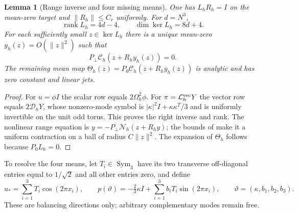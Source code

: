 \documentclass[11pt]{article}
\newtheorem{lemma}[lemma]{Lemma}
\theoremstyle{definition}
\theoremstyle{remark}
\begin{document}
\begin{lemma}[Range inverse and four missing means]
\label{lem:supp-initial-range}
One has $L_hR_h=I$ on the mean-zero target and
$\|R_h\|\le C_r$ uniformly.  For $d=N^3$,
\begin{equation}
 \operatorname{rank}L_h=4d-4,
 \qquad\dim\ker L_h=8d+4.
 \label{eq:supp-initial-rank}
\end{equation}
For each sufficiently small $z\in\ker L_h$ there is a unique mean-zero
$y_h(z)=O(\|z\|^2)$ such that
\begin{equation}
 P_\perp\mathscr C_h(z+R_hy_h(z))=0.
 \label{eq:supp-initial-range-zero}
\end{equation}
The remaining mean map
$\Theta_h(z)=P_0\mathscr C_h(z+R_hy_h(z))$ is analytic and has zero constant
and linear jets.
\end{lemma}
\begin{proof}
For $u=\phi I$ the scalar row equals $2\Omega_h^2\phi$.  For
$\pi=\mathcal L_h^{\rm vec}Y$ the vector row equals $2\mathcal D_hY$, whose
nonzero-mode symbol is $|\kappa|^2I+\kappa\kappa^T/3$ and is uniformly
invertible on the unit odd torus.  This proves the right inverse and rank.
The nonlinear range equation is
$y=-P_\perp\mathscr N_h(z+R_hy)$; the bounds of
 make it a uniform contraction on a ball of
radius $C\|z\|^2$.  The expansion of $\Theta_h$ follows because
$P_0L_h=0$.
\end{proof}

To resolve the four means, let $T_i\in\operatorname{Sym}_3$ have its two
transverse off-diagonal entries equal to $1/\sqrt2$ and all other entries
zero, and define
\begin{equation}
 u_*=\sum_{i=1}^3T_i\cos(2\pi x_i),\qquad
 p(\vartheta)=-\tfrac23\kappa I
       +\sum_{i=1}^3b_iT_i\sin(2\pi x_i),
 \qquad \vartheta=(\kappa,b_1,b_2,b_3).
 \label{eq:supp-initial-seed}
\end{equation}
These are balancing directions only; arbitrary complementary modes remain
free.
\end{document}
